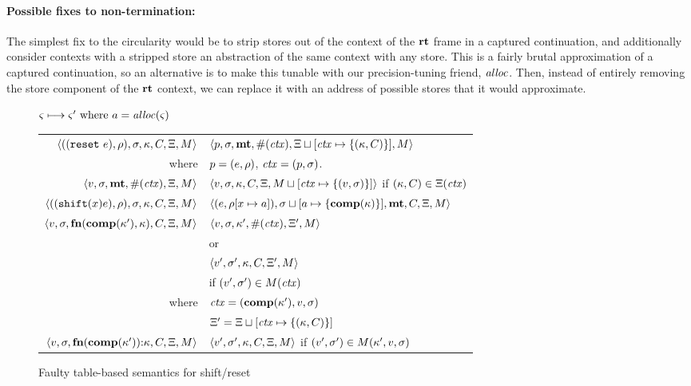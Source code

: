 \paragraph{Possible fixes to non-termination:} The simplest fix to the circularity would be to strip stores out of the context of the $\mathbf{rt}$ frame in a captured continuation, and additionally consider contexts with a stripped store an abstraction of the same context with any store.
%
This is a fairly brutal approximation of a captured continuation, so an alternative is to make this tunable with our precision-tuning friend, $\mathit{alloc}$.
%
Then, instead of entirely removing the store component of the $\mathbf{rt}$ context, we can replace it with an address of possible stores that it would approximate.

\begin{figure*}
  \centering
  $\varsigma \longmapsto \varsigma' \text{ where } a = \mathit{alloc}(\varsigma)$ \\
  \begin{tabular}{r|l}
    \hline
    $\langle ((\texttt{reset}\ e), \rho), \sigma, \kappa, C, \Xi, M \rangle$
    &
    $\langle p, \sigma, \mathbf{mt}, \#(\mathit{ctx}), \Xi\sqcup[\mathit{ctx} \mapsto \{ (\kappa,C) \}], M \rangle$
    \\
    where & $p = (e, \rho)$, $\mathit{ctx} = (p, \sigma)$.
    \\
    $\langle v, \sigma, \mathbf{mt}, \#(\mathit{ctx}), \Xi, M \rangle$
    &
    $\langle v, \sigma, {\kappa}, {C}, \Xi, M\sqcup[\mathit{ctx} \mapsto \{ (v,\sigma) \}] \rangle$
    if $(\kappa,C) \in \Xi(\mathit{ctx})$
    \\
    $\langle ((\texttt{shift} (x) e), \rho), \sigma, \kappa, C, \Xi, M \rangle$
    &
    $\langle (e, \rho[x \mapsto a]), \sigma\sqcup[a \mapsto \{ \mathbf{comp}(\kappa) \}],\mathbf{mt},C,\Xi,M \rangle$
    \\
    $\langle v,\sigma,\mathbf{fn}{}(\mathbf{comp}(\kappa'), \kappa), C, \Xi, M \rangle$
    &
    $\langle v, \sigma, \kappa', \#(\mathit{ctx}), \Xi',M \rangle$
    \\
    & or \\
    & $\langle v', \sigma', \kappa, C, \Xi',M \rangle$
    \\ & \quad if $(v',\sigma') \in M(\mathit{ctx})$
    \\
    where & $\mathit{ctx} = (\mathbf{comp}(\kappa'), v, \sigma)$ \\
          & $\Xi' = \Xi\sqcup[\mathit{ctx} \mapsto \{ (\kappa,C) \}]$
    \\
    $\langle v,\sigma,\mathbf{fn}{}(\mathbf{comp}(\kappa')){\tt :} \kappa, C, \Xi, M \rangle$
    &
    $\langle v', \sigma', \kappa, C, \Xi,M \rangle$ if $(v',\sigma') \in M(\kappa',v,\sigma)$
  \end{tabular}  
  \caption{Faulty table-based semantics for shift/reset}
  \label{fig:shift-reset-table0}
\end{figure*}

